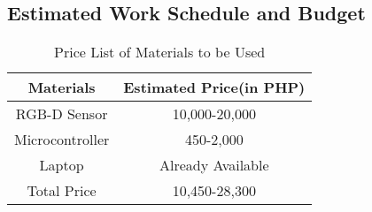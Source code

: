 \subsection{Estimated Work Schedule and Budget}
\begin{table}[!htb]
	\caption{Price List of Materials to be Used}
	\centering
	\begin{tabular}{|c|c|}
		\hline
		Materials & Estimated Price(in PHP) \\
		\hline
		RGB-D Sensor & 10,000-20,000 \\
		\hline
		Microcontroller & 450-2,000 \\
		\hline
		Laptop & Already Available \\
		\hline
		Total Price & 10,450-28,300 \\
		\hline
	\end{tabular}
\end{table}